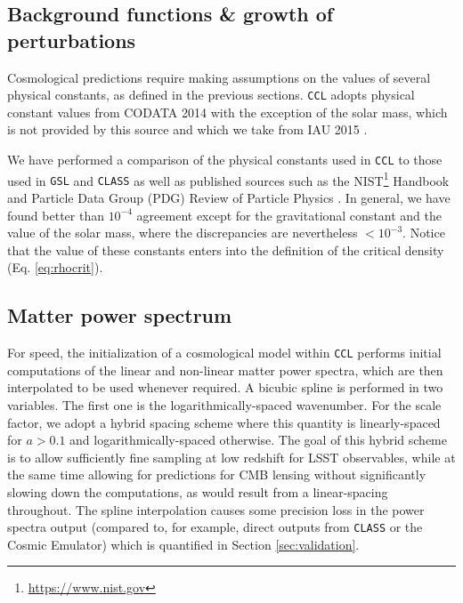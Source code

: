 \documentclass[\docopts]{\docclass}
\newcommand{\ccl}{{\tt CCL}\xspace}
\newcommand{\class}{{\tt CLASS}\xspace}
\begin{document}
\subsection{Background functions \& growth of perturbations}
\label{sec:distances}

Cosmological predictions require making assumptions on the values of several physical constants, as defined in the previous sections. \ccl adopts physical constant values from CODATA 2014 \citep{CODATA14} with the exception of the solar mass, which is not provided by this source and which we take from IAU 2015 \citep{IAU15}.

We have performed a comparison of the physical constants used in \ccl to those used in {\tt GSL} and \class as well as published sources such as the NIST\footnote{\url{https://www.nist.gov}} Handbook and Particle Data Group (PDG) Review of Particle Physics \citep{Beringer:1900zz}. In general, we have found better than $10^{-4}$ agreement except for the gravitational constant and the value of the solar mass, where the discrepancies are nevertheless $<10^{-3}$. Notice that the value of these constants enters into the definition of the critical density (Eq. \ref{eq:rhocrit}). 


\subsection{Matter power spectrum}\label{ssec:mpspec}

For speed, the initialization of a cosmological model within \ccl performs initial computations of the linear and non-linear matter power spectra, which are then interpolated to be used whenever required. A bicubic spline is performed in two variables. The first one is the logarithmically-spaced wavenumber. For the scale factor, we adopt a hybrid spacing scheme where this quantity is linearly-spaced for $a>0.1$ and logarithmically-spaced otherwise. The goal of this hybrid scheme is to allow sufficiently fine sampling at low redshift for LSST observables, while at the same time allowing for predictions for CMB lensing without significantly slowing down the computations, as would result from a linear-spacing throughout. The spline interpolation causes some precision loss in the power spectra output (compared to, for example, direct outputs from \class or the Cosmic Emulator) which is quantified in Section \ref{sec:validation}.
\end{document}
